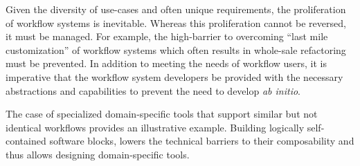 Given the diversity of use-cases and often unique requirements, the
proliferation of workflow systems is inevitable. Whereas this proliferation
cannot be reversed, it must be managed. For example, the high-barrier to
overcoming ``last mile customization'' of workflow systems which often
results in whole-sale refactoring must be prevented. In addition to meeting
the needs of workflow users, it is imperative that the workflow system
developers be provided with the necessary abstractions and capabilities to
prevent the need to develop \textit{ab initio}.

The case of specialized domain-specific tools that support similar but not
identical workflows provides an illustrative example. Building logically
self-contained software blocks, lowers the technical barriers to their
composability and thus allows designing domain-specific tools.






